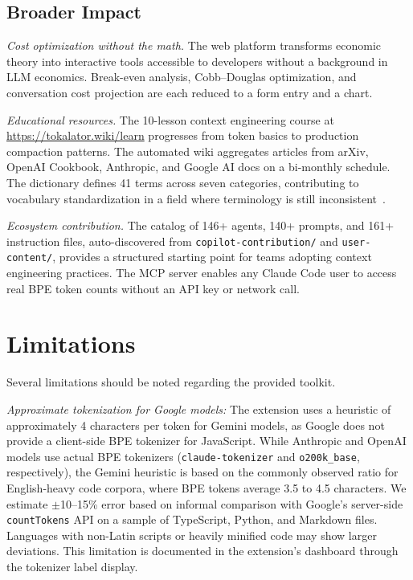 \documentclass[a4paper,fleqn]{cas-dc}
\begin{document}
\subsection{Broader Impact}

\textit{Cost optimization without the math.} The web platform transforms economic theory into interactive tools accessible to developers without a background in LLM economics. Break-even analysis, Cobb–Douglas optimization, and conversation cost projection are each reduced to a form entry and a chart.

\textit{Educational resources.} The 10-lesson context engineering course at \url{https://tokalator.wiki/learn} progresses from token basics to production compaction patterns. The automated wiki aggregates articles from arXiv, OpenAI Cookbook, Anthropic, and Google AI docs on a bi-monthly schedule. The dictionary defines 41 terms across seven categories, contributing to vocabulary standardization in a field where terminology is still inconsistent~\cite{burnham2025context}.

\textit{Ecosystem contribution.} The catalog of 146+ agents, 140+ prompts, and 161+ instruction files, auto-discovered from \texttt{copilot-contribution/} and \texttt{user-content/}, provides a structured starting point for teams adopting context engineering practices. The MCP server enables any Claude Code user to access real BPE token counts without an API key or network call.



\section{Limitations}
\label{sec:limitations}

Several limitations should be noted regarding the provided toolkit.

\textit{Approximate tokenization for Google models:} The extension uses a heuristic of approximately 4 characters per token for Gemini models, as Google does not provide a client-side BPE tokenizer for JavaScript. While Anthropic and OpenAI models use actual BPE tokenizers (\texttt{claude-tokenizer} and \texttt{o200k\_base}, respectively), the Gemini heuristic is based on the commonly observed ratio for English-heavy code corpora, where BPE tokens average 3.5 to 4.5 characters. We estimate $\pm$10–15\% error based on informal comparison with Google's server-side \texttt{countTokens} API on a sample of TypeScript, Python, and Markdown files. Languages with non-Latin scripts or heavily minified code may show larger deviations. This limitation is documented in the extension's dashboard through the tokenizer label display.
\end{document}
